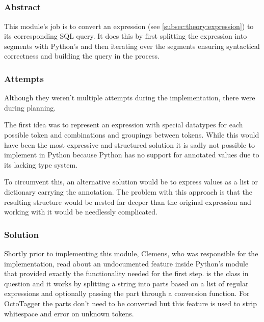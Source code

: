 \subsection{}
\def\kapitelautor{Clemens Stadlbauer}
\label{subsec:mod:expression}

\subsubsection{Abstract}

This module's job is to convert an expression (see
\cref{subsec:theory:expression}) to its corresponding SQL query. It does this by
first splitting the expression into segments with Python's 
\cite{scanner} and then iterating over the segments ensuring syntactical
correctness and building the query in the process.

\subsubsection{Attempts}

Although they weren't multiple attempts during the implementation, there were
during planning.

The first idea was to represent an expression with special datatypes for each
possible token and combinations and groupings between tokens. While this would
have been the most expressive and structured solution it is sadly not possible
to implement in Python because Python has no support for annotated values due
to its lacking type system.

To circumvent this, an alternative solution would be to express values as a
list or dictionary carrying the annotation. The problem with this approach is
that the resulting structure would be nested far deeper than the original
expression and working with it would be needlessly complicated.

\subsubsection{Solution} %

Shortly prior to implementing this module, Clemens, who was responsible for the
implementation, read about an undocumented feature inside Python's 
module that provided exactly the functionality needed for the first step.
 is the class in question and it works by splitting a string
into parts based on a list of regular expressions and optionally passing the
part through a conversion function. For OctoTagger the parts don't need to be
converted but this feature is used to strip whitespace and error on unknown
tokens.


